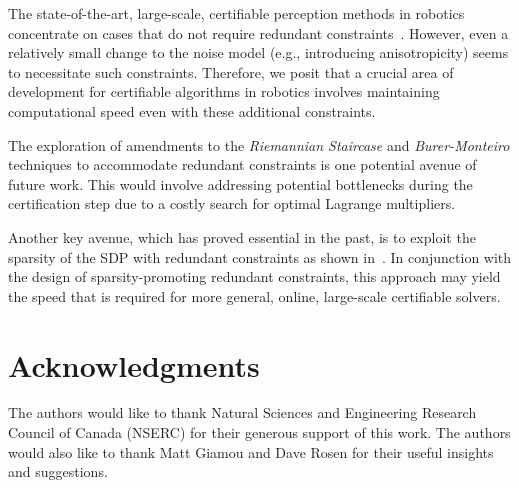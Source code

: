\documentclass[lettersize,journal]{IEEEtran}
\begin{document}
The state-of-the-art, large-scale, certifiable perception methods in robotics concentrate on cases that do not require redundant constraints~\cite{rosenSESyncCertifiablyCorrect2019,brialesCartanSyncFastGlobal2017}. However, even a relatively small change to the noise model (e.g., introducing anisotropicity) seems to necessitate such constraints. Therefore, we posit that a crucial area of development for certifiable algorithms in robotics involves maintaining computational speed even with these additional constraints. 

The exploration of amendments to the \emph{Riemannian Staircase} and \emph{Burer-Monteiro} techniques to accommodate redundant constraints is one potential avenue of future work. This would involve addressing potential bottlenecks during the certification step due to a costly search for optimal Lagrange multipliers. 

Another key avenue, which has proved essential in the past, is to exploit the sparsity of the SDP with redundant constraints as shown in~\cite{zhengChordalFactorwidthDecompositions2021}. In conjunction with the design of sparsity-promoting redundant constraints, this approach may yield the speed that is required for more general, online, large-scale certifiable solvers.

\section{Acknowledgments}

The authors would like to thank Natural Sciences and Engineering Research Council of Canada (NSERC) for their generous support of this work. The authors would also like to thank Matt Giamou and Dave Rosen for their useful insights and suggestions.
 



\appendix
\end{document}
